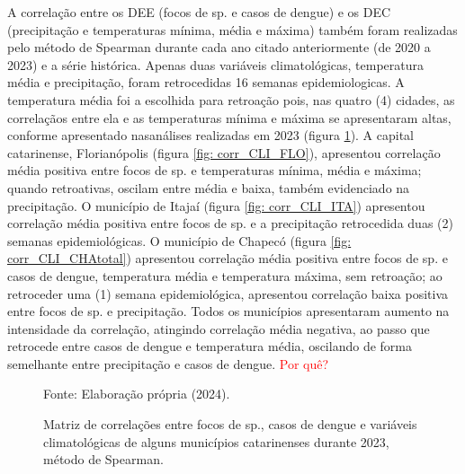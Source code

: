 \documentclass[
	12pt,				%
	openright,			%
	oneside,			%
	a4paper,			%
	english,			%
	french,				%
	spanish,			%
	brazil				%
	dvipsnames, table]{abntex2}
\begin{document}
\indent A correlação entre os \acrshort{DEE} (focos de  sp. e casos de dengue) e os \acrshort{DEC} (precipitação e temperaturas mínima, média e máxima) também foram realizadas pelo método de Spearman durante cada ano citado anteriormente (de 2020 a 2023) e a série histórica. Apenas duas variáveis climatológicas, temperatura média e precipitação, foram retrocedidas 16 semanas epidemiologicas. A temperatura média foi a escolhida para retroação pois, nas quatro (4) cidades, as correlaçãos entre ela e as temperaturas mínima e máxima se apresentaram altas, conforme apresentado nasanálises realizadas em 2023 (figura \ref{fig: matriz_corr_CLI}). A capital catarinense, Florianópolis (figura \ref{fig: corr_CLI_FLO}), apresentou correlação média positiva entre focos de  sp. e temperaturas mínima, média e máxima; quando retroativas, oscilam entre média e baixa, também evidenciado na precipitação. O município de Itajaí (figura \ref{fig: corr_CLI_ITA}) apresentou correlação média positiva entre focos de  sp. e a precipitação retrocedida duas (2) semanas epidemiológicas. O município de Chapecó (figura \ref{fig: corr_CLI_CHAtotal}) apresentou correlação média positiva entre focos de  sp. e casos de dengue, temperatura média e temperatura máxima, sem retroação; ao retroceder uma (1) semana epidemiológica, apresentou correlação baixa positiva entre focos de  sp. e precipitação. Todos os municípios apresentaram aumento na intensidade da correlação, atingindo correlação média negativa, ao passo que retrocede entre casos de dengue e temperatura média, oscilando de forma semelhante entre precipitação e casos de dengue. \textcolor{red}{Por quê?}

\begin{figure}[htbp]
    \begin{center}
    \caption{Matriz de correlações entre focos de  sp., casos de dengue e variáveis climatológicas de alguns municípios catarinenses durante 2023, método de Spearman.}
    \label{fig: matriz_corr_CLI}
    \hfill
    \hfill
    \end{center}
    \small{Fonte: Elaboração própria (2024).}
\end{figure}
\end{document}

